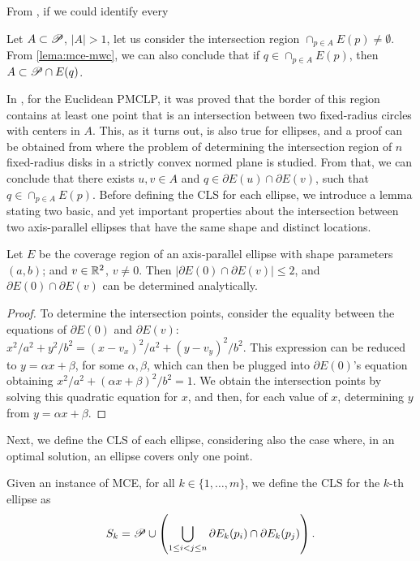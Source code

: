 
From , if we could identify every 

Let $A \subset \mathscr{P}$, $|A|>1$, let us consider the intersection region $\cap_{p\in A} E(p) \neq \emptyset$. From \autoref{lema:mce-mwc}, we can also conclude that if $q \in \cap_{p\in A} E(p)$, then $A \subset \mathscr{P} \cap E(q)$.


In \cite{church:1984}, for the Euclidean PMCLP, it was proved that the border of this region contains at least one point that is an intersection between two fixed-radius circles with centers in $A$. This, as it turns out, is also true for ellipses, and a proof can be obtained from \cite{bi} where the problem of determining the intersection region of $n$ fixed-radius disks in a strictly convex normed plane is studied.
From that, we can conclude that there exists $u, v \in A$ and $q \in \partial E(u) \cap \partial E(v)$, such that $q \in \cap_{p\in A} E(p)$.
Before defining the CLS for each ellipse, we introduce a lemma stating two basic, and yet important properties about the intersection between two axis-parallel ellipses that have the same shape and distinct locations.

\begin{lem}\label{lema:e2p}
	Let $E$ be the coverage region of an axis-parallel ellipse with shape parameters $(a,b)$; and $v \in \mathbb{R}^2$, $v\neq0$. Then $|\partial E(0) \cap \partial E(v)| \le 2$, and $\partial E(0) \cap \partial E(v)$ can be determined analytically.
\end{lem}

\begin{proof}
	To determine the intersection points, consider the equality between the equations of $\partial E(0)$ and $\partial E(v)$:
	$x^2/a^2 + y^2/b^2 = (x-v_x)^2/a^2 + (y-v_y)^2/b^2.$
	This expression can be reduced to $y=\alpha x + \beta$, for some $\alpha, \beta$, which can then be plugged into $\partial E(0)$'s equation obtaining $x^2/a^2 + (\alpha x + \beta)^2/b^2 = 1$.
	We obtain the intersection points by solving this quadratic equation for $x$, and then, for each value of $x$,  determining $y$ from $y=\alpha x + \beta$.
\end{proof}
Next, we define the CLS of each ellipse, considering also the case where, in an optimal solution, an ellipse covers only one point.
\begin{definition}\label{def:cls_mce}
	Given an instance of MCE, for all $k \in \{1, \dots, m\}$, we define the CLS for the $k$-th ellipse as
	\begin{equation}
	S_k = \mathscr{P} \cup \left(\bigcup_{1 \le i < j \le n} \partial E_k(p_i) \cap \partial E_k(p_j) \right).
	\end{equation}
\end{definition}

